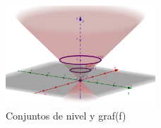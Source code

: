 \begin{definition} 
\begin{figure}[h!] %
    \centering
    \includegraphics[width=0.5\textwidth]{../figs/conjunto3_r3.png} %
    \caption{Conjuntos de nivel y graf(f)}
    \label{fig:ejemplo} %
\end{figure}


\end{definition}
